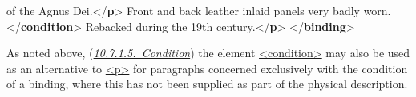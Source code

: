 \begin{shaded}
\hspace*{1em}\hspace*{1em}\hspace*{1em}\hspace*{1em} of the Agnus Dei.{</\textbf{p}>}\mbox{}\newline 
{}\mbox{}\newline 
{}Front and back leather inlaid panels very badly worn.{</\textbf{condition}>}\mbox{}\newline 
{}Rebacked during the 19th century.{</\textbf{p}>}\mbox{}\newline 
{</\textbf{binding}>}\end{shaded}\egroup\par \par
As noted above, (\textit{\hyperref[msphco]{10.7.1.5.\ Condition}}) the element \hyperref[TEI.condition]{<condition>} may also be used as an alternative to \hyperref[TEI.p]{<p>} for paragraphs concerned exclusively with the condition of a binding, where this has not been supplied as part of the physical description.
